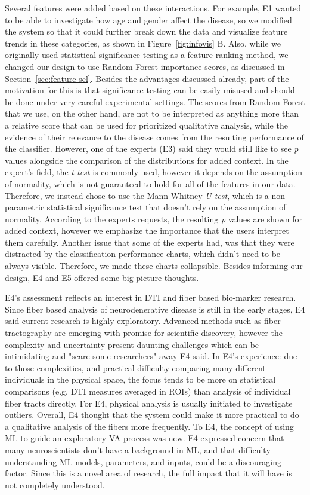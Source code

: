 Several features were added based on these interactions. For example, E1 wanted to be able to investigate how age and gender affect the disease, so we modified the system so that it could further break down the data and visualize feature trends in these categories, as shown in Figure~\ref{fig:infovis} B. Also, while we originally used statistical significance testing as a feature ranking method, we changed our design to use Random Forest importance scores, as discussed in Section~\ref{sec:feature-sel}. Besides the advantages discussed already, part of the motivation for this is that significance testing can be easily misused and should be done under very careful experimental settings. The scores from Random Forest that we use, on the other hand, are not to be interpreted as anything more than a relative score that can be used for prioritized qualitative analysis, while the evidence of their relevance to the disease comes from the resulting performance of the classifier. However, one of the experts (E3) said they would still like to see \textit{p} values alongside the comparison of the distributions for added context. In the expert's field, the \textit{t-test} is commonly used, however it depends on the assumption of normality, which is not guaranteed to hold for all of the features in our data. Therefore, we instead chose to use the Mann-Whitney \textit{U-test}, which is a non-parametric statistical significance test that doesn't rely on the assumption of normality. According to the experts requests, the resulting \textit{p} values are shown for added context, however we emphasize the importance that the users interpret them carefully. Another issue that some of the experts had, was that they were distracted by the classification performance charts, which didn't need to be always visible. Therefore, we made these charts collapsible. Besides informing our design, E4 and E5 offered some big picture thoughts.

E4's assessment reflects an interest in DTI and fiber based bio-marker research. Since fiber based analysis of neurodenerative disease is still in the early stages, E4 said current research is highly exploratory. Advanced methods such as fiber tractography are emerging with promise for scientific discovery, however the complexity and uncertainty present daunting challenges which can be intimidating and "scare some researchers" away E4 said. In E4's experience: due to those complexities, and practical difficulty comparing many different individuals in the physical space, the focus tends to be more on statistical comparisons (e.g. DTI measures averaged in ROIs) than analysis of individual fiber tracts directly. For E4, physical analysis is usually initiated to investigate outliers. Overall, E4 thought that the system could make it more practical to do a qualitative analysis of the fibers more frequently. To E4, the concept of using ML to guide an exploratory VA process was new. E4 expressed concern that many neuroscientists don't have a background in ML, and that difficulty understanding ML models, parameters, and inputs, could be a discouraging factor. Since this is a novel area of research, the full impact that it will have is not completely understood. 

